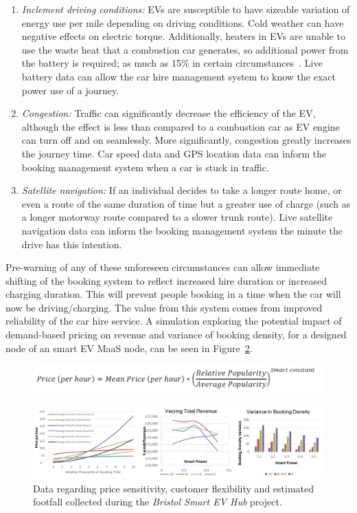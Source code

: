 \documentclass[journal]{IEEEtran}
\begin{document}
\begin{enumerate}
\item {\emph{Inclement driving conditions:}} EVs are susceptible to
have sizeable variation of energy use per mile depending on driving
conditions. Cold weather can have negative effects on electric
torque. Additionally, heaters in EVs are unable to use the waste heat
that a combustion car generates, so additional power from the battery
is required; as much as 15\% in certain
circumstances~\cite{dft:2008}. Live battery data can allow the car
hire management system to know the exact power use of a journey.
\item {\emph{Congestion:}} Traffic can significantly decrease the
efficiency of the EV, although the effect is less than compared to a
combustion car as EV engine can turn off and on seamlessly. More
significantly, congestion greatly increases the journey time. Car
speed data and GPS location data can inform the booking management
system when a car is stuck in traffic.
\item {\emph{Satellite navigation:}} If an individual decides to take
a longer route home, or even a route of the same duration of time but
a greater use of charge (such as a longer motorway route compared to a
slower trunk route). Live satellite navigation data can inform the
booking management system the minute the drive has this intention.
\end{enumerate}

Pre-warning of any of these unforeseen circumstances can allow
immediate shifting of the booking system to reflect increased hire
duration or increased charging duration. This will prevent people
booking in a time when the car will now be driving/charging. The value
from this system comes from improved reliability of the car hire
service. A simulation exploring the potential impact of demand-based
pricing on revenue and variance of booking density, for a designed
node of an smart EV MaaS node, can be seen in
Figure~\ref{fig:smartpricegraphs}.

\begin{figure}[!h]
\centering
\includegraphics[width=\columnwidth]{images/smartpricingformula.png}
\label{fig:smartpricingformula}
\end{figure}

\begin{figure}[!htb]
\centering
\includegraphics[width=\textwidth]{images/smartpricegraphs.png}
\caption{Data regarding price sensitivity, customer flexibility and
estimated footfall collected during the {\emph{Bristol Smart EV Hub}} project.}
\label{fig:smartpricegraphs}
\end{figure}
\end{document}

